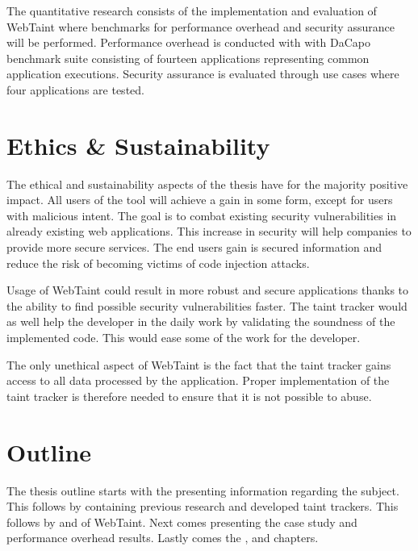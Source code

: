 The quantitative research consists of the implementation and evaluation of WebTaint where benchmarks for performance overhead and security assurance will be performed. Performance overhead is conducted with with DaCapo \parencite{dacapo} benchmark suite consisting of fourteen applications representing common application executions. Security assurance is evaluated through use cases where four applications are tested.



\section{Ethics \& Sustainability}
\label{Ethics}
The ethical and sustainability aspects of the thesis have for the majority positive impact. All users of the tool will achieve a gain in some form, except for users with malicious intent. The goal is to combat existing security vulnerabilities in already existing web applications. This increase in security will help companies to provide more secure services. The end users gain is secured information and reduce the risk of becoming victims of code injection attacks.

Usage of WebTaint could result in more robust and secure applications thanks to the ability to find possible security vulnerabilities faster. The taint tracker would as well help the developer in the daily work by validating the soundness of the implemented code. This would ease some of the work for the developer.

The only unethical aspect of WebTaint is the fact that the taint tracker gains access to all data processed by the application. Proper implementation of the taint tracker is therefore needed to ensure that it is not possible to abuse.



\section{Outline}
\label{Outline}
The thesis outline starts with the \textit{} presenting information regarding the subject. This follows by \textit{} containing previous research and developed taint trackers. This follows by \textit{} and \textit{} of WebTaint. Next comes \textit{} presenting the case study and performance overhead results. Lastly comes the \textit{}, \textit{} and \textit{} chapters.